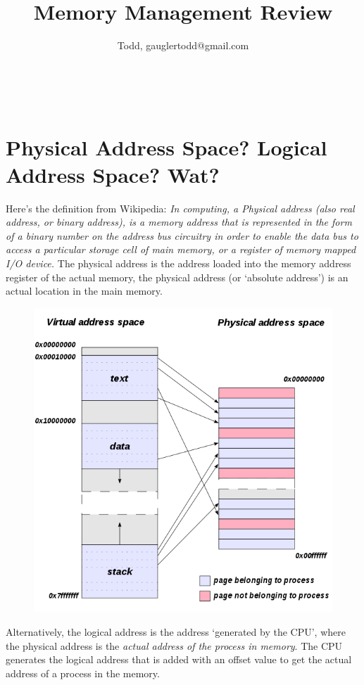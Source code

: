 \documentclass{article}
\title{
Memory Management Review} \author{Todd, gauglertodd@gmail.com}
\begin{document}
\maketitle
\noindent \\[-1cm]

\tableofcontents

\section{Physical Address Space? Logical Address Space? Wat?}
Here's the definition from Wikipedia: \emph{In computing, a Physical address (also real address, or binary address), is a memory address that is represented in the form of a binary number on the address bus circuitry in order to enable the data bus to access a particular storage cell of main memory, or a register of memory mapped I/O device.} The physical address is the address loaded into the memory address register of the actual memory, the physical address (or `absolute address') is an actual location in the main memory. 

\begin{figure}[h]
\centering
\includegraphics[scale=.7]{fig1.png}
\end{figure}


Alternatively, the logical address is the address `generated by the CPU', where the physical address is the \emph{actual address of the process in memory}. The CPU generates the logical address that is added with an offset value to get the actual address of a process in the memory. 
\end{document}
